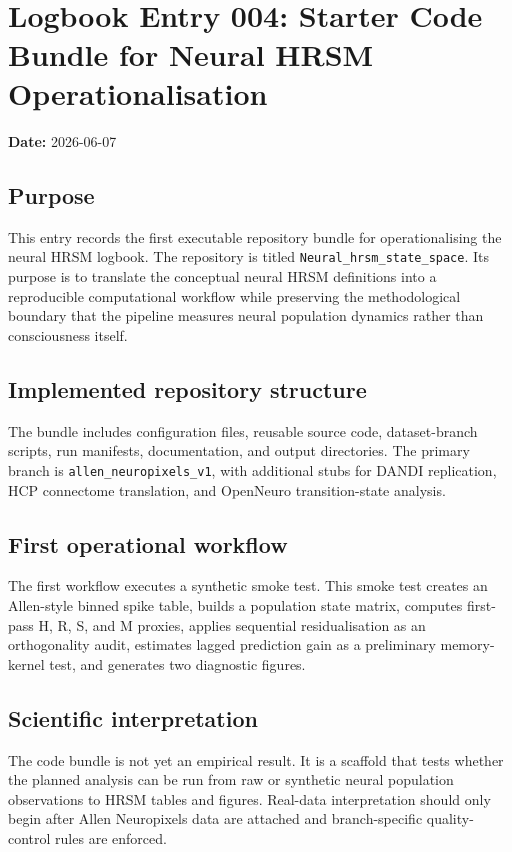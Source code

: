 \
\section{Logbook Entry 004: Starter Code Bundle for Neural HRSM Operationalisation}

\textbf{Date:} 2026-06-07

\subsection{Purpose}

This entry records the first executable repository bundle for operationalising the neural HRSM logbook. The repository is titled \texttt{Neural\_hrsm\_state\_space}. Its purpose is to translate the conceptual neural HRSM definitions into a reproducible computational workflow while preserving the methodological boundary that the pipeline measures neural population dynamics rather than consciousness itself.

\subsection{Implemented repository structure}

The bundle includes configuration files, reusable source code, dataset-branch scripts, run manifests, documentation, and output directories. The primary branch is \texttt{allen\_neuropixels\_v1}, with additional stubs for DANDI replication, HCP connectome translation, and OpenNeuro transition-state analysis.

\subsection{First operational workflow}

The first workflow executes a synthetic smoke test. This smoke test creates an Allen-style binned spike table, builds a population state matrix, computes first-pass H, R, S, and M proxies, applies sequential residualisation as an orthogonality audit, estimates lagged prediction gain as a preliminary memory-kernel test, and generates two diagnostic figures.

\subsection{Scientific interpretation}

The code bundle is not yet an empirical result. It is a scaffold that tests whether the planned analysis can be run from raw or synthetic neural population observations to HRSM tables and figures. Real-data interpretation should only begin after Allen Neuropixels data are attached and branch-specific quality-control rules are enforced.


